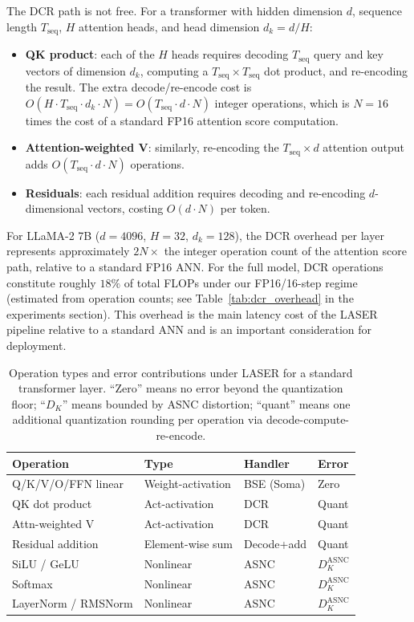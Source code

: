 \documentclass{article}
\theoremstyle{plain}
\theoremstyle{definition}
\theoremstyle{remark}
\begin{document}
The DCR path is not free. For a transformer with hidden dimension $d$, sequence length
$T_\mathrm{seq}$, $H$ attention heads, and head dimension $d_k = d/H$:
\begin{itemize}
\item \textbf{QK product}: each of the $H$ heads requires decoding $T_\mathrm{seq}$
  query and key vectors of dimension $d_k$, computing a $T_\mathrm{seq} \times
  T_\mathrm{seq}$ dot product, and re-encoding the result. The extra decode/re-encode
  cost is $O(H \cdot T_\mathrm{seq} \cdot d_k \cdot N) = O(T_\mathrm{seq} \cdot d
  \cdot N)$ integer operations, which is $N = 16$ times the cost of a standard
  FP16 attention score computation.
\item \textbf{Attention-weighted V}: similarly, re-encoding the $T_\mathrm{seq} \times d$
  attention output adds $O(T_\mathrm{seq} \cdot d \cdot N)$ operations.
\item \textbf{Residuals}: each residual addition requires decoding and re-encoding
  $d$-dimensional vectors, costing $O(d \cdot N)$ per token.
\end{itemize}
For LLaMA-2 7B ($d = 4096$, $H = 32$, $d_k = 128$), the DCR overhead per layer
represents approximately $2N \times$ the integer operation count of the attention
score path, relative to a standard FP16 ANN. For the full model, DCR operations
constitute roughly $18\%$ of total FLOPs under our FP16/16-step regime (estimated
from operation counts; see Table~\ref{tab:dcr_overhead} in the experiments section).
This overhead is the main latency cost of the LASER pipeline relative to a standard
ANN and is an important consideration for deployment.

\begin{table}[h!]
\centering
\caption{Operation types and error contributions under LASER for a standard transformer
layer. ``Zero'' means no error beyond the quantization floor; ``$D_K$'' means bounded
by ASNC distortion; ``quant'' means one additional quantization rounding per operation
via decode-compute-re-encode.}
\label{tab:transformer_ops}
\small
\begin{tabular}{llll}
\toprule
\textbf{Operation} & \textbf{Type} & \textbf{Handler} & \textbf{Error} \\
\midrule
Q/K/V/O/FFN linear  & Weight-activation  & BSE (Soma)  & Zero \\
QK dot product       & Act-activation     & DCR         & Quant \\
Attn-weighted V      & Act-activation     & DCR         & Quant \\
Residual addition    & Element-wise sum   & Decode+add  & Quant \\
SiLU / GeLU         & Nonlinear          & ASNC        & $D_K^{\mathrm{ASNC}}$ \\
Softmax              & Nonlinear          & ASNC        & $D_K^{\mathrm{ASNC}}$ \\
LayerNorm / RMSNorm & Nonlinear          & ASNC        & $D_K^{\mathrm{ASNC}}$ \\
\bottomrule
\end{tabular}
\end{table}
\end{document}
